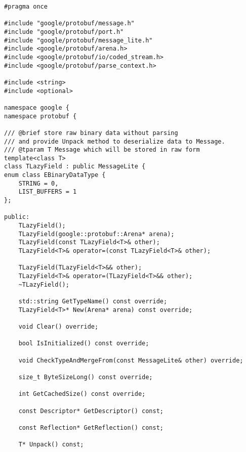 \footnotesize
\begin{lstlisting}[style=CodeListing]
#pragma once

#include "google/protobuf/message.h"
#include "google/protobuf/port.h"
#include "google/protobuf/message_lite.h"
#include <google/protobuf/arena.h>
#include <google/protobuf/io/coded_stream.h>
#include <google/protobuf/parse_context.h>

#include <string>
#include <optional>

namespace google {
namespace protobuf {

/// @brief store raw binary data without parsing
/// and provide Unpack method to deserialize data to Message.
/// @tparam T Message which will be stored in raw form
template<class T>
class TLazyField : public MessageLite {
enum class EBinaryDataType {
    STRING = 0,
    LIST_BUFFERS = 1
};

public:
    TLazyField();
    TLazyField(google::protobuf::Arena* arena);
    TLazyField(const TLazyField<T>& other);
    TLazyField<T>& operator=(const TLazyField<T>& other);

    TLazyField(TLazyField<T>&& other);
    TLazyField<T>& operator=(TLazyField<T>&& other);
    ~TLazyField();

    std::string GetTypeName() const override;
    TLazyField<T>* New(Arena* arena) const override;

    void Clear() override;

    bool IsInitialized() const override;

    void CheckTypeAndMergeFrom(const MessageLite& other) override;

    size_t ByteSizeLong() const override;

    int GetCachedSize() const override;

    const Descriptor* GetDescriptor() const;

    const Reflection* GetReflection() const;

    T* Unpack() const;
\end{lstlisting}
\pagebreak
